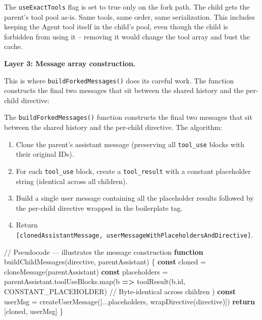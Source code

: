 \documentclass[
  english,
  11pt,
  letterpaper,
]{book}
\newenvironment{Shaded}{\begin{snugshade}}{\end{snugshade}}
\newcommand{\AttributeTok}[1]{\textcolor[rgb]{0.40,0.45,0.13}{#1}}
\newcommand{\CommentTok}[1]{\textcolor[rgb]{0.37,0.37,0.37}{#1}}
\newcommand{\ControlFlowTok}[1]{\textcolor[rgb]{0.00,0.23,0.31}{\textbf{#1}}}
\newcommand{\FunctionTok}[1]{\textcolor[rgb]{0.28,0.35,0.67}{#1}}
\newcommand{\KeywordTok}[1]{\textcolor[rgb]{0.00,0.23,0.31}{\textbf{#1}}}
\newcommand{\NormalTok}[1]{\textcolor[rgb]{0.00,0.23,0.31}{#1}}
\newcommand{\OperatorTok}[1]{\textcolor[rgb]{0.37,0.37,0.37}{#1}}
\providecommand{\tightlist}{%
  \setlength{\itemsep}{0pt}\setlength{\parskip}{0pt}}
\begin{document}
The \texttt{useExactTools} flag is set to true only on the fork path.
The child gets the parent's tool pool as-is. Same tools, same order,
same serialization. This includes keeping the Agent tool itself in the
child's pool, even though the child is forbidden from using it --
removing it would change the tool array and bust the cache.

\textbf{Layer 3: Message array construction.}

This is where \texttt{buildForkedMessages()} does its careful work. The
function constructs the final two messages that sit between the shared
history and the per-child directive:

The \texttt{buildForkedMessages()} function constructs the final two
messages that sit between the shared history and the per-child
directive. The algorithm:

\begin{enumerate}
\def\labelenumi{\arabic{enumi}.}
\tightlist
\item
  Clone the parent's assistant message (preserving all
  \texttt{tool\_use} blocks with their original IDs).
\item
  For each \texttt{tool\_use} block, create a \texttt{tool\_result} with
  a constant placeholder string (identical across all children).
\item
  Build a single user message containing all the placeholder results
  followed by the per-child directive wrapped in the boilerplate tag.
\item
  Return
  \texttt{{[}clonedAssistantMessage,\ userMessageWithPlaceholdersAndDirective{]}}.
\end{enumerate}

\begin{Shaded}
\begin{Highlighting}[]
\CommentTok{// Pseudocode — illustrates the message construction}
\KeywordTok{function} \FunctionTok{buildChildMessages}\NormalTok{(directive}\OperatorTok{,}\NormalTok{ parentAssistant) \{}
  \KeywordTok{const}\NormalTok{ cloned }\OperatorTok{=} \FunctionTok{cloneMessage}\NormalTok{(parentAssistant)}
  \KeywordTok{const}\NormalTok{ placeholders }\OperatorTok{=}\NormalTok{ parentAssistant}\OperatorTok{.}\AttributeTok{toolUseBlocks}\OperatorTok{.}\FunctionTok{map}\NormalTok{(b }\KeywordTok{=\textgreater{}}
    \FunctionTok{toolResult}\NormalTok{(b}\OperatorTok{.}\AttributeTok{id}\OperatorTok{,}\NormalTok{ CONSTANT\_PLACEHOLDER)  }\CommentTok{// Byte{-}identical across children}
\NormalTok{  )}
  \KeywordTok{const}\NormalTok{ userMsg }\OperatorTok{=} \FunctionTok{createUserMessage}\NormalTok{([}\OperatorTok{...}\NormalTok{placeholders}\OperatorTok{,} \FunctionTok{wrapDirective}\NormalTok{(directive)])}
  \ControlFlowTok{return}\NormalTok{ [cloned}\OperatorTok{,}\NormalTok{ userMsg]}
\NormalTok{\}}
\end{Highlighting}
\end{Shaded}
\end{document}
